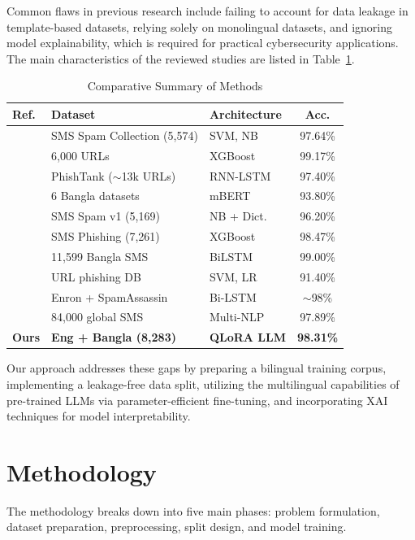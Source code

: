 \documentclass[journal]{IEEEtran}
\begin{document}
Common flaws in previous research include failing to account for data leakage in template-based datasets, relying solely on monolingual datasets, and ignoring model explainability, which is required for practical cybersecurity applications. The main characteristics of the reviewed studies are listed in Table~\ref{tab:comparative}.

\begin{table}[htbp]
\caption{Comparative Summary of Methods}
\label{tab:comparative}
\centering
\begin{tabular}{lllc}
\toprule
\textbf{Ref.} & \textbf{Dataset} & \textbf{Architecture} & \textbf{Acc.} \\
\midrule
\cite{ref1} & SMS Spam Collection (5,574) & SVM, NB & 97.64\% \\
\cite{ref2} & 6,000 URLs & XGBoost & 99.17\% \\
\cite{ref3} & PhishTank ($\sim$13k URLs) & RNN-LSTM & 97.40\% \\
\cite{ref4} & 6 Bangla datasets & mBERT & 93.80\% \\
\cite{ref5} & SMS Spam v1 (5,169) & NB + Dict. & 96.20\% \\
\cite{ref6} & SMS Phishing (7,261) & XGBoost & 98.47\% \\
\cite{ref7} & 11,599 Bangla SMS & BiLSTM & 99.00\% \\
\cite{ref8} & URL phishing DB & SVM, LR & 91.40\% \\
\cite{ref9} & Enron + SpamAssassin & Bi-LSTM & $\sim$98\% \\
\cite{ref10} & 84,000 global SMS & Multi-NLP & 97.89\% \\
\textbf{Ours} & \textbf{Eng + Bangla (8,283)} & \textbf{QLoRA LLM} & \textbf{98.31\%} \\
\bottomrule
\end{tabular}
\end{table}

Our approach addresses these gaps by preparing a bilingual training corpus, implementing a leakage-free data split, utilizing the multilingual capabilities of pre-trained LLMs via parameter-efficient fine-tuning, and incorporating XAI techniques for model interpretability.

\section{Methodology}

The methodology breaks down into five main phases: problem formulation, dataset preparation, preprocessing, split design, and model training.
\end{document}
